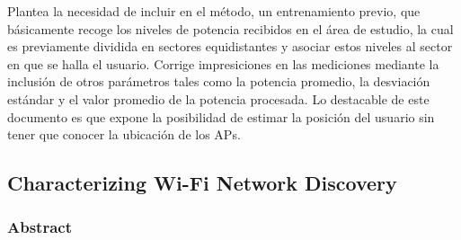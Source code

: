 Plantea la necesidad de incluir en el método, un entrenamiento previo, que básicamente recoge los niveles de potencia recibidos en el área de estudio, la cual es previamente dividida en sectores equidistantes y asociar estos niveles al sector en que se halla el usuario. Corrige impresiciones en las mediciones mediante la inclusión de otros parámetros tales como la potencia promedio, la desviación estándar y  el valor promedio de la potencia procesada. Lo destacable de este documento es que expone la posibilidad de estimar la posición del usuario sin tener que conocer la ubicación de los APs.

\subsection{Characterizing Wi-Fi Network Discovery}
\subsubsection{Abstract}

